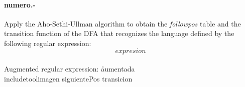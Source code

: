 

\paragraph{{numero}.-}\label{p{numero}}
Apply the Aho-Sethi-Ullman algorithm to obtain the \emph{followpos} table and the transition function of the DFA that recognizes the language defined by the following regular expression:
\[
    {expresion}
\]
~\\
Augmented regular expression: \h{{aumentada}} \\

{includetool}{{imagen}}
{siguientePos}
\quad
{transicion}
